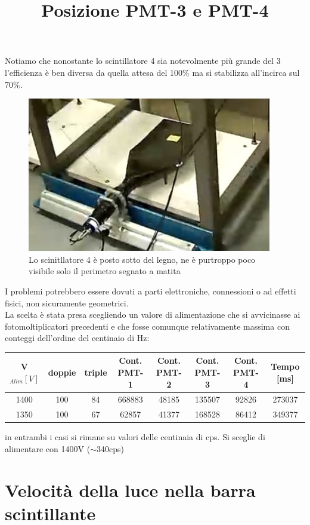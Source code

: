 \documentclass[a4paper]{article}
\begin{document}
Notiamo che nonostante lo scintillatore 4 sia notevolmente più grande del 3 l'efficienza è ben diversa da quella attesa del 100$\%$ ma si stabilizza all'incirca sul 70$\%$.

\begin{figure}[H]
\centering
\title{Posizione PMT-3 e PMT-4}
\begin{center}
\includegraphics[scale=0.4]{./immagini/TimeOfFlight/CalPMT4app.jpg}
\caption{Lo scinitllatore 4 è posto sotto del legno, ne è purtroppo poco visibile solo il perimetro segnato a matita}
\label{fig:PMT3posPMT4}
\end{center}
\end{figure}

I problemi potrebbero essere dovuti a parti elettroniche, connessioni o ad effetti fisici, non sicuramente geometrici.\\
La scelta è stata presa scegliendo un valore di alimentazione che si avvicinasse ai fotomoltiplicatori precedenti e che fosse comunque relativamente massima con conteggi dell'ordine del centinaio di Hz:

\begin{tabular}{|c|c|c|c|c|c|c|c|}
\hline
V$_{Alim} [V]$ & doppie & triple & Cont. PMT-1 & Cont. PMT-2 & Cont. PMT-3 & Cont. PMT-4 & Tempo [ms]\\
\hline
1400 & 100 & 84 & 668883 & 48185 & 135507 & 92826 & 273037\\
\hline
1350 & 100 & 67 & 62857 & 41377 & 168528 & 86412 & 349377\\
\hline
\end{tabular}

in entrambi i casi si rimane su valori delle centinaia di cps. Si sceglie di alimentare con 1400V  ($\sim$340cps)

\section{Velocità della luce nella barra scintillante}
\label{sec:VLuce}
\end{document}
